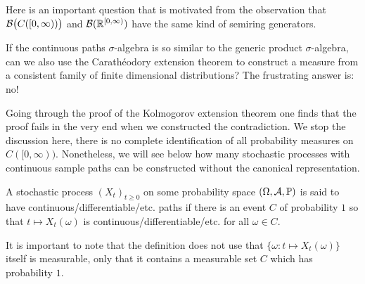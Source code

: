 Here is an important question that is motivated from the observation that $\cB \big( C([0,\infty))\big)$ and $\mathcal B(\R^{[0,\infty)})$ have the same kind of semiring generators.
\begin{ltipp}
If the continuous paths $\sigma$-algebra is so similar to the generic product $\sigma$-algebra, can we also use the Carath\'eodory extension theorem to construct a measure from a consistent family of finite dimensional distributions? The frustrating answer is: no!
\end{ltipp}
Going through the proof of the Kolmogorov extension theorem one finds that the proof fails in the very end when we constructed the contradiction. We stop the discussion here, there is no complete identification of all probability measures on $C([0,\infty))$. Nonetheless, we will see below how many stochastic processes with continuous sample paths can be constructed without the canonical representation.

\begin{ldef}
	\begin{deff}
		A stochastic process $(X_t)_{t\geq 0}$ on some probability space $(\Omega, \mathcal A, \P)$ is said to have continuous/differentiable/etc. paths if there is an event $C$ of probability $1$ so that $t\mapsto X_t(\omega)$ is continuous/differentiable/etc. for all $\omega \in C$.
	\end{deff}
\end{ldef}
It is important to note that the definition does not use that $\{\omega: t\mapsto X_t(\omega)\}$ itself is measurable, only that it contains a measurable set $C$ which has probability $1$.\smallskip

